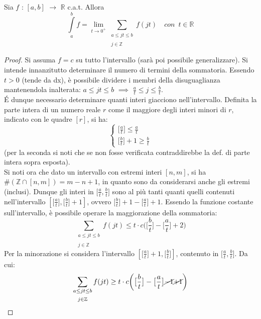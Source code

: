 \documentclass[10pt, oneside]{book}
\theoremstyle{plain}
\begin{document}
\begin{lem}
    Sia $f$ : $[a,b]$ $\rightarrow$ $\mathbb{R}$ c.a.t. Allora
    \[\int\limits_{a}^{b} f = \lim\limits_{t \rightarrow 0^+}^{} \sum_{\substack{a \leq jt \leq b \\~\\ j \in \mathbb{Z}}} f(jt) \quad con \enspace t \in \mathbb{R}\]
\end{lem}
\begin{proof}
    Si assuma $f = c$ su tutto l'intervallo (sarà poi possibile generalizzare).
    Si intende innanzitutto determinare il numero di termini della sommatoria. Essendo $t > 0$ (tende da dx), è possibile dividere i membri della disuguaglianza mantenendola inalterata: $a \leq jt \leq b$ $\implies$ $\frac{a}{t} \leq j \leq \frac{b}{t}$.
    \\\'E dunque necessario determinare quanti interi giacciono nell'intervallo. Definita la parte intera di un numero reale $r$ come il maggiore degli interi minori di $r$, indicato con le quadre $[r]$, si ha:
    \[\begin{cases}
        \big[\frac{a}{t}\big] \leq \frac{a}{t}\\
        \big[\frac{b}{t}\big] + 1 \geq \frac{b}{t}
    \end{cases}\]
    (per la seconda si noti che se non fosse verificata contraddirebbe la def. di parte intera sopra esposta).
    \\Si noti ora che dato un intervallo con estremi interi $[n, m]$, si ha $\#(\mathbb{Z} \cap [n,m]) = m - n + 1$, in quanto sono da considerarsi anche gli estremi (inclusi). Dunque gli interi in $\big[\frac{a}{t}, \frac{b}{t}\big]$ sono al più tanti quanti quelli contenuti nell'intervallo $[\big[\frac{a}{t}\big], \big[\frac{b}{t}\big] + 1]$, ovvero $\big[\frac{b}{t}\big] + 1 - \big[\frac{a}{t}\big] + 1$. Essendo la funzione costante sull'intervallo, è possibile operare la maggiorazione della sommatoria:
    \[\sum_{\substack{a \leq jt \leq b \\~\\ j \in \mathbb{Z}}} f(jt) \leq t \cdot c \bigg(\big[\frac{b}{t}\big] - \big[\frac{a}{t}\big] + 2\bigg)\]
    Per la minorazione si considera l'intervallo $[\big[\frac{a}{t}\big] + 1, \big[\frac{b}{t}\big]]$, contenuto in $\big[\frac{a}{t}, \frac{b}{t}\big]$. Da cui:
    \[\sum_{\substack{a \leq jt \leq b \\~\\ j \in \mathbb{Z}}} f(jt) \geq t \cdot c \bigg(\big[\frac{b}{t}\big] - \big[\frac{a}{t}\big] \cancel{-1} \cancel{+1}\bigg)\]

\end{proof}
\end{document}
